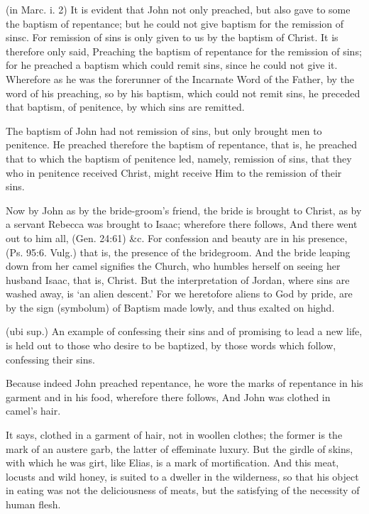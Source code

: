  (in Marc. i. 2) It is evident that John not only preached, but also gave to some the baptism of repentance; but he could not give baptism for the remission of sinsc. For remission of sins is only given to us by the baptism of Christ. It is therefore only said, Preaching the baptism of repentance for the remission of sins; for he preached a baptism which could remit sins, since he could not give it. Wherefore as he was the forerunner of the Incarnate Word of the Father, by the word of his preaching, so by his baptism, which could not remit sins, he preceded that baptism, of penitence, by which sins are remitted.

 The baptism of John had not remission of sins, but only brought men to penitence. He preached therefore the baptism of repentance, that is, he preached that to which the baptism of penitence led, namely, remission of sins, that they who in penitence received Christ, might receive Him to the remission of their sins.

 Now by John as by the bride-groom’s friend, the bride is brought to Christ, as by a servant Rebecca was brought to Isaac; wherefore there follows, And there went out to him all, (Gen. 24:61) \&c. For confession and beauty are in his presence, (Ps. 95:6. Vulg.) that is, the presence of the bridegroom. And the bride leaping down from her camel signifies the Church, who humbles herself on seeing her husband Isaac, that is, Christ. But the interpretation of Jordan, where sins are washed away, is ‘an alien descent.’ For we heretofore aliens to God by pride, are by the sign (symbolum) of Baptism made lowly, and thus exalted on highd.

 (ubi sup.) An example of confessing their sins and of promising to lead a new life, is held out to those who desire to be baptized, by those words which follow, confessing their sins.

 Because indeed John preached repentance, he wore the marks of repentance in his garment and in his food, wherefore there follows, And John was clothed in camel’s hair.

 It says, clothed in a garment of hair, not in woollen clothes; the former is the mark of an austere garb, the latter of effeminate luxury. But the girdle of skins, with which he was girt, like Elias, is a mark of mortification. And this meat, locusts and wild honey, is suited to a dweller in the wilderness, so that his object in eating was not the deliciousness of meats, but the satisfying of the necessity of human flesh.

